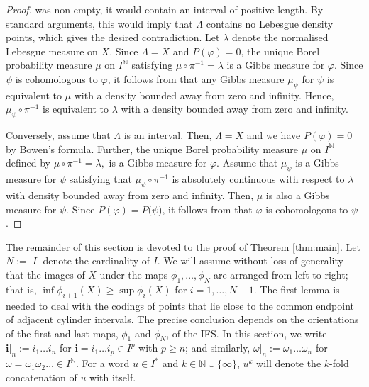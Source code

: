 \documentclass[11pt]{amsart}
\newcommand\NN{\mathbb{N}}
\newcommand{\1}{1}
\newcommand{\N}{\mathbb{N}}
\begin{document}
\begin{proof}
was non-empty, it would contain an interval of positive length. By
standard arguments, this would imply that $\Lambda$ contains no Lebesgue
density points, which gives the desired contradiction. Let $\lambda$
denote the normalised Lebesgue measure on $X$. Since $\Lambda=X$
and $P(\varphi)=0$, the unique Borel probability measure $\mu$ on
$I^{\mathbb{N}}$ satisfying $\mu\circ\pi^{-1}=\lambda$ is a Gibbs
measure for $\varphi$. Since $\psi$ is cohomologous to $\varphi$,
it follows from \cite[Theorem 2.2.7]{MauUrb03} that any Gibbs measure
$\mu_{\psi}$ for $\psi$ is equivalent to $\mu$ with a density bounded
away from zero and infinity. Hence, $\mu_{\psi}\circ\pi^{-1}$ is
equivalent to $\lambda$ with a density bounded away from zero
and infinity. 

Conversely, assume that $\Lambda$ is an interval. Then, $\Lambda=X$
and we have $P(\varphi)=0$ by Bowen's formula. Further, the unique
Borel probability measure $\mu$ on $I^{\mathbb{N}}$ defined by $\mu\circ\pi^{-1}=\lambda,$
is a Gibbs measure for $\varphi$. Assume that $\mu_{\psi}$ is a
Gibbs measure for $\psi$ satisfying that $\mu_{\psi}\circ\pi^{-1}$
is absolutely continuous with respect to $\lambda$ with density
bounded away from zero and infinity. Then, $\mu$ is also a Gibbs
measure for $\psi$. Since $P(\varphi)=P(\psi$),  it follows from
\cite[Theorem 2.2.7]{MauUrb03} that $\varphi$ is cohomologous to
$\psi$. 
\end{proof}


The remainder of this section is devoted to the proof of Theorem \ref{thm:main}.
{Let $N:=|I|$ denote the cardinality of $I$.} We will assume without loss of generality that the images of $X$ under the maps $\phi_1,\dots,\phi_N$ are arranged from left to right; that is, $\inf\phi_{i+1}(X)\geq \sup\phi_i(X)$ for $i=1,\dots,N-1$. The first lemma is needed to deal with the codings of points that lie close to the common endpoint of adjacent cylinder intervals. The precise conclusion depends on the orientations of the first and last maps, $\phi_1$ and $\phi_N$, of the IFS. In this section, we write $\mathbf{i}|_n:=i_1\dots i_n$ for $\mathbf{i}=i_1\dots i_p\in I^p$ with $p\geq n$; and similarly, $\omega|_n:=\omega_1\dots\omega_n$ for $\omega=\omega_1\omega_2\dots\in I^\NN$. {For a word $u\in I^*$ and $k\in\NN\cup\{\infty\}$, $u^k$ will denote the $k$-fold concatenation of $u$ with itself.}
\end{document}

